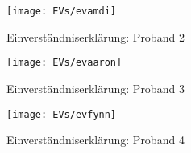 \documentclass[pagesize,paper=A4,fontsize=12pt,utf8,numbers=noenddot,bibliography=totoc,listof=totoc,DIV=11,BCOR=1mm]{scrreprt}
\begin{document}
\begin{figure}[htp]     %
\centering
\texttt{[image: EVs/evamdi]} 
\caption {Einverständniserklärung: Proband 2} 
\end{figure}

\begin{figure}[htp]     %
\centering
\texttt{[image: EVs/evaaron]} 
\caption {Einverständniserklärung: Proband 3} 
\end{figure}

\begin{figure}[htp]     %
\centering
\texttt{[image: EVs/evfynn]} 
\caption {Einverständniserklärung: Proband 4} 
\end{figure}
\end{document}
